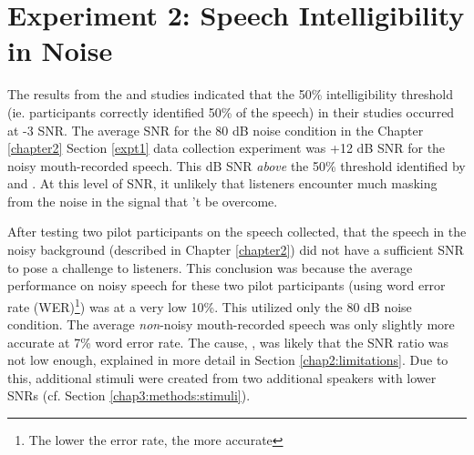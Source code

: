 


\DIFdelbegin %
\DIFdelend \DIFaddbegin \section{Experiment 2: Speech Intelligibility in Noise}
\DIFaddend \label{expt2}

The results from the \cite{ding:13} and \cite{gilbert:13} studies indicated that the 50\% intelligibility threshold (ie. participants correctly identified 50\% of the speech) in their studies occurred at -3 \DIFdelbegin {}\DIFdelend \DIFaddbegin {}\DIFaddend SNR.  The average SNR for the 80 dB noise condition in the Chapter \ref{chapter2} Section \ref{expt1} data collection experiment was +12 dB SNR for the noisy mouth-recorded speech.  This \DIFdelbegin {}\DIFdelend \DIFaddbegin {} dB SNR \textit{above} the 50\% threshold identified by \cite{ding:13} and \cite{gilbert:13}.  At this level of SNR, it \DIFdelbegin {}\DIFdelend \DIFaddbegin {}\DIFaddend unlikely that listeners \DIFdelbegin {}\DIFdelend \DIFaddbegin {}\DIFaddend encounter much masking from the noise in the signal that \DIFdelbegin {}\DIFdelend \DIFaddbegin {}\DIFaddend 't be overcome.

After testing two pilot participants on the speech collected, \DIFdelbegin {}\DIFdelend \DIFaddbegin {}\DIFaddend that the speech in the noisy background (described in Chapter \ref{chapter2}) did not have a sufficient SNR to pose a challenge to listeners.  This conclusion was \DIFdelbegin {}\DIFdelend \DIFaddbegin {}\DIFaddend because the average performance on noisy speech for these two pilot participants (using word error rate (WER)\footnote{The lower the error rate, the more accurate}) was at a very low 10\%.  This utilized only the 80 dB noise condition.  The average \textit{non}-noisy mouth-recorded speech was only slightly more accurate at 7\% word error rate. The cause, \DIFdelbegin {}\DIFdelend \DIFaddbegin {}\DIFaddend , was likely that the SNR ratio was not low enough, explained in more detail in Section \ref{chap2:limitations}.  Due to this, additional stimuli were created from two additional speakers with lower SNRs (cf. Section \ref{chap3:methods:stimuli}).

